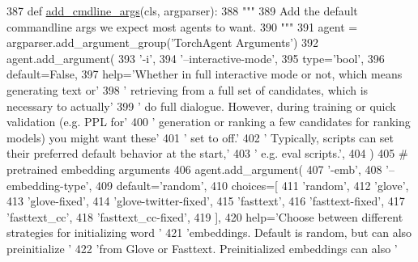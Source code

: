 \begin{DoxyCode}
387     \textcolor{keyword}{def }\hyperlink{namespaceparlai_1_1agents_1_1drqa_1_1config_a62fdd5554f1da6be0cba185271058320}{add\_cmdline\_args}(cls, argparser):
388         \textcolor{stringliteral}{"""}
389 \textcolor{stringliteral}{        Add the default commandline args we expect most agents to want.}
390 \textcolor{stringliteral}{        """}
391         agent = argparser.add\_argument\_group(\textcolor{stringliteral}{'TorchAgent Arguments'})
392         agent.add\_argument(
393             \textcolor{stringliteral}{'-i'},
394             \textcolor{stringliteral}{'--interactive-mode'},
395             type=\textcolor{stringliteral}{'bool'},
396             default=\textcolor{keyword}{False},
397             help=\textcolor{stringliteral}{'Whether in full interactive mode or not,  which means generating text or'}
398             \textcolor{stringliteral}{' retrieving from a full set of candidates, which is necessary to actually'}
399             \textcolor{stringliteral}{' do full dialogue. However, during training or quick validation (e.g. PPL for'}
400             \textcolor{stringliteral}{' generation or ranking a few candidates for ranking models) you might want these'}
401             \textcolor{stringliteral}{' set to off.'}
402             \textcolor{stringliteral}{' Typically, scripts can set their preferred default behavior at the start,'}
403             \textcolor{stringliteral}{' e.g. eval scripts.'},
404         )
405         \textcolor{comment}{# pretrained embedding arguments}
406         agent.add\_argument(
407             \textcolor{stringliteral}{'-emb'},
408             \textcolor{stringliteral}{'--embedding-type'},
409             default=\textcolor{stringliteral}{'random'},
410             choices=[
411                 \textcolor{stringliteral}{'random'},
412                 \textcolor{stringliteral}{'glove'},
413                 \textcolor{stringliteral}{'glove-fixed'},
414                 \textcolor{stringliteral}{'glove-twitter-fixed'},
415                 \textcolor{stringliteral}{'fasttext'},
416                 \textcolor{stringliteral}{'fasttext-fixed'},
417                 \textcolor{stringliteral}{'fasttext\_cc'},
418                 \textcolor{stringliteral}{'fasttext\_cc-fixed'},
419             ],
420             help=\textcolor{stringliteral}{'Choose between different strategies for initializing word '}
421             \textcolor{stringliteral}{'embeddings. Default is random, but can also preinitialize '}
422             \textcolor{stringliteral}{'from Glove or Fasttext. Preinitialized embeddings can also '}

\end{DoxyCode}
